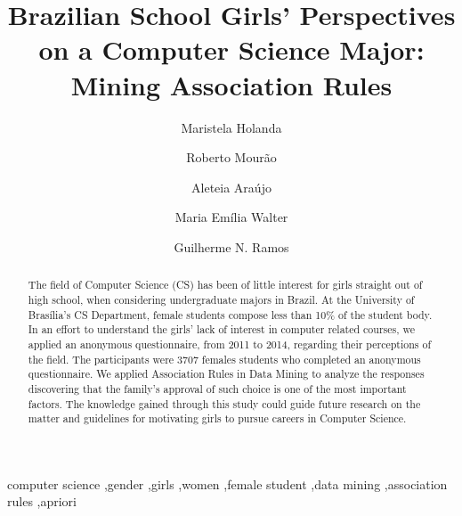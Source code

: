 \documentclass[preprint,12pt]{elsarticle}%
\begin{document}
\begin{frontmatter}



\title{Brazilian School Girls' Perspectives on a Computer Science Major: Mining Association Rules}

\author{Maristela Holanda}%
%
%
\author{Roberto Mourão}%
\author{Aleteia Araújo}%
\author{Maria Emília Walter}%
\author{Guilherme N. Ramos}%



\address{Department of Computer Science, University of Brasília, Brasília, Brazil}%

\begin{abstract}
The field of Computer Science (CS) has been of little interest for girls straight out of high school, when considering undergraduate majors in Brazil. At the University of Brasília’s CS Department, female students compose less than 10\% of the student body. In an effort to understand the girls’ lack of interest in computer related courses, we applied an anonymous questionnaire, from 2011 to 2014, regarding their perceptions of the field.  The participants were 3707 females students who completed an anonymous questionnaire. We applied Association Rules in Data Mining to analyze the responses discovering that the family's approval of such choice is one of the most important factors. The knowledge gained through this study could guide future research on the matter and guidelines for motivating girls to pursue careers in Computer Science.
\end{abstract}

\begin{keyword}
computer science \sep gender \sep girls \sep women \sep female student \sep data mining \sep association rules \sep apriori%


\end{keyword}

\end{frontmatter}
\end{document}
